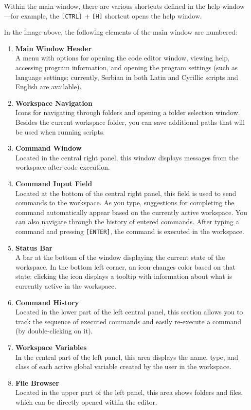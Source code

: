 \documentclass[12pt,a4paper]{article}
\begin{document}
Within the main window, there are various shortcuts defined in the help window---for example, the \texttt{[CTRL]} + \texttt{[H]} shortcut opens the help window.

In the image above, the following elements of the main window are numbered:
\begin{enumerate}
  \item \textbf{Main Window Header}\\
        A menu with options for opening the code editor window, viewing help, accessing program information, and opening the program settings (such as language settings; currently, Serbian in both Latin and Cyrillic scripts and English are available).
  \item \textbf{Workspace Navigation}\\
        Icons for navigating through folders and opening a folder selection window. Besides the current workspace folder, you can save additional paths that will be used when running scripts.
  \item \textbf{Command Window}\\
        Located in the central right panel, this window displays messages from the workspace after code execution.
  \item \textbf{Command Input Field}\\
        Located at the bottom of the central right panel, this field is used to send commands to the workspace. As you type, suggestions for completing the command automatically appear based on the currently active workspace. You can also navigate through the history of entered commands. After typing a command and pressing \texttt{[ENTER]}, the command is executed in the workspace.
  \item \textbf{Status Bar}\\
        A bar at the bottom of the window displaying the current state of the workspace. In the bottom left corner, an icon changes color based on that state; clicking the icon displays a tooltip with information about what is currently active in the workspace.
  \item \textbf{Command History}\\
        Located in the lower part of the left central panel, this section allows you to track the sequence of executed commands and easily re-execute a command (by double-clicking on it).
  \item \textbf{Workspace Variables}\\
        In the central part of the left panel, this area displays the name, type, and class of each active global variable created by the user in the workspace.
  \item \textbf{File Browser}\\
        Located in the upper part of the left panel, this area shows folders and files, which can be directly opened within the editor.
\end{enumerate}
\end{document}
